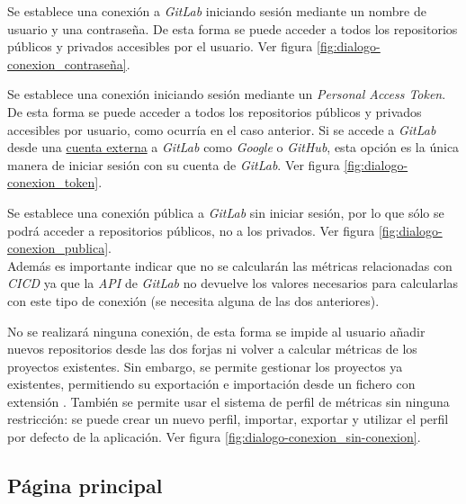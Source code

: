 \begin{description}
	\tightlist
	\item[Iniciar sesión en \textit{GitLab} mediante usuario y contraseña.] Se establece una conexión a \textit{GitLab} iniciando sesión mediante un nombre de usuario y una contraseña. De esta forma se puede acceder a todos los repositorios públicos y privados accesibles por el usuario. Ver figura \ref{fig:dialogo-conexion_contraseña}.
	\item[Iniciar sesión mediante \textit{Personal Access Token}.] Se establece una conexión iniciando sesión mediante un \textit{Personal Access Token}. De esta forma se puede acceder a todos los repositorios públicos y privados accesibles por usuario, como ocurría en el caso anterior. 
	Si se accede a \textit{GitLab} desde una \underline{cuenta externa} a \textit{GitLab} como \textit{Google} o \textit{GitHub}, esta opción es la única manera de iniciar sesión con su cuenta de \textit{GitLab}. Ver figura \ref{fig:dialogo-conexion_token}.\\
	\item[Usar una conexión pública hacia \textit{GitLab}.] Se establece una conexión pública a \textit{GitLab} sin iniciar sesión, por lo que sólo se podrá acceder a repositorios públicos, no a los privados. Ver figura \ref{fig:dialogo-conexion_publica}.\\
	Además es importante indicar que no se calcularán las métricas relacionadas con \textit{CICD} ya que la \textit{API} de \textit{GitLab} no devuelve los valores necesarios para calcularlas con este tipo de conexión (se necesita alguna de las dos anteriores).
	\item[No utilizar ninguna conexión.] No se realizará ninguna conexión, de esta forma se impide al usuario añadir nuevos repositorios desde las dos forjas ni volver a calcular métricas de los proyectos existentes. Sin embargo, se permite gestionar los proyectos ya existentes, permitiendo su exportación e importación desde un fichero con extensión . También se permite usar el sistema de perfil de métricas sin ninguna restricción: se puede crear un nuevo perfil, importar, exportar y utilizar el perfil por defecto de la aplicación. Ver figura \ref{fig:dialogo-conexion_sin-conexion}.
\end{description}

\newpage
\subsection{Página principal}

